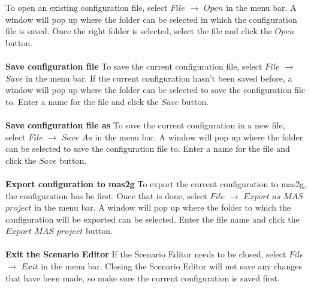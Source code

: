 To open an existing configuration file, select $File$ $\to$ $Open$ in the menu bar. A window will pop up where the folder can be selected in which the configuration file is saved. Once the right folder is selected, select the file and click the $Open$ button.
\\\\
\textbf{Save configuration file}
To save the current configuration file, select $File$ $\to$ $Save$ in the menu bar. If the current configuration hasn't been saved before, a window will pop up where the folder can be selected to save the configuration file to. Enter a name for the file and click the $Save$ button.
\\\\
\textbf{Save configuration file as}
To save the current configuration in a new file, select $File$ $\to$ $Save$ $As$ in the menu bar. A window will pop up where the folder can be selected to save the configuration file to. Enter a name for the file and click the $Save$ button.
\\\\
\textbf{Export configuration to mas2g}
To export the current configuration to mas2g, the configuration has be first. Once that is done, select $File$ $\to$ $Export$ $as$ $MAS$ $project$ in the menu bar. A window will pop up where the folder to which the configuration will be exported can be selected. Enter the file name and click the $Export$ $MAS$ $project$ button.
\\\\
\textbf{Exit the Scenario Editor}
If the Scenario Editor needs to be closed, select $File$ $\to$ $Exit$ in the menu bar. Closing the Scenario Editor will not save any changes that have been made, so make sure the current configuration is saved first.

